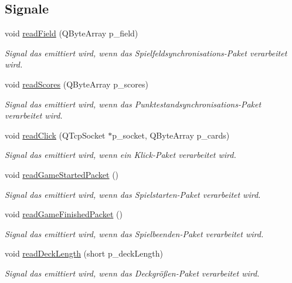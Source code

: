 \subsection*{Signale}
\begin{DoxyCompactItemize}
\item 
void \hyperlink{class_packet_handler_a7434b94845f0389703fa4d85e8487372}{read\+Field} (Q\+Byte\+Array p\+\_\+field)
\begin{DoxyCompactList}\small\item\em Signal das emittiert wird, wenn das Spielfeldsynchronisations-\/\+Paket verarbeitet wird. \end{DoxyCompactList}\item 
void \hyperlink{class_packet_handler_a766789a5ff926bee167e308b620f8807}{read\+Scores} (Q\+Byte\+Array p\+\_\+scores)
\begin{DoxyCompactList}\small\item\em Signal das emittiert wird, wenn das Punktestandsynchronisations-\/\+Paket verarbeitet wird. \end{DoxyCompactList}\item 
void \hyperlink{class_packet_handler_a8cb91da2e7e174f5b781d5338a54427e}{read\+Click} (Q\+Tcp\+Socket $\ast$p\+\_\+socket, Q\+Byte\+Array p\+\_\+cards)
\begin{DoxyCompactList}\small\item\em Signal das emittiert wird, wenn ein Klick-\/\+Paket verarbeitet wird. \end{DoxyCompactList}\item 
void \hyperlink{class_packet_handler_a84c59146583fc6ee254940cce4377b54}{read\+Game\+Started\+Packet} ()
\begin{DoxyCompactList}\small\item\em Signal das emittiert wird, wenn das Spielstarten-\/\+Paket verarbeitet wird. \end{DoxyCompactList}\item 
void \hyperlink{class_packet_handler_aa47688eb98584d262f5ba2f98f019105}{read\+Game\+Finished\+Packet} ()
\begin{DoxyCompactList}\small\item\em Signal das emittiert wird, wenn das Spielbeenden-\/\+Paket verarbeitet wird. \end{DoxyCompactList}\item 
void \hyperlink{class_packet_handler_abc467ba059a00877d8fae31672395ac4}{read\+Deck\+Length} (short p\+\_\+deck\+Length)
\begin{DoxyCompactList}\small\item\em Signal das emittiert wird, wenn das Deckgrößen-\/\+Paket verarbeitet wird. \end{DoxyCompactList}\item 

\end{DoxyCompactItemize}
